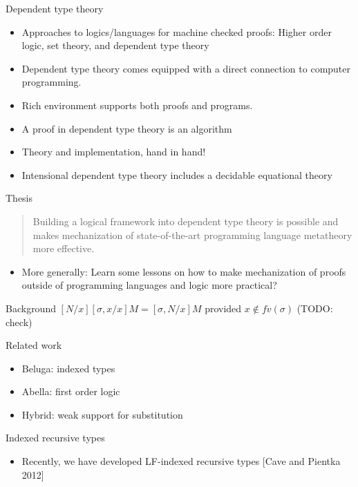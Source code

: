 \documentclass[usenames,dvipsnames]{beamer}
\begin{document}
\begin{frame}{Dependent type theory}
\begin{itemize}
\item Approaches to logics/languages for
machine checked proofs: Higher order logic, set theory, and dependent
type theory
\item Dependent type theory comes equipped with a direct
connection to computer programming.
\item Rich environment supports both proofs and
programs.
\item A proof in dependent type theory is an algorithm
\item Theory and implementation, hand in hand!
\item Intensional dependent type theory includes a decidable equational theory
\end{itemize}
\end{frame}

\begin{frame}{Thesis}
\begin{quote}Building a logical framework into dependent type
theory is possible and makes mechanization of state-of-the-art programming
language metatheory more effective.
\end{quote}
\begin{itemize}
\pause
\item More generally: Learn some lessons on how
to make mechanization of proofs outside of programming languages and
logic more practical?
\end{itemize}
\end{frame}

\begin{frame}{Background}
$[N/x][\sigma,x/x]M = [\sigma,N/x]M$ provided $x \not\in fv(\sigma)$ (TODO: check)
\end{frame}

\begin{frame}{Related work}
\begin{itemize}
\item Beluga: indexed types
\item Abella: first order logic
\item Hybrid: weak support for substitution
\end{itemize}
\end{frame}

\begin{frame}{Indexed recursive types}
\begin{itemize}
\item Recently, we have developed LF-indexed recursive types
[Cave and Pientka 2012]
\end{itemize}
\end{frame}
\end{document}
